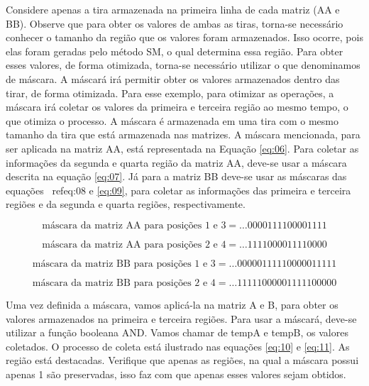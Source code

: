 \documentclass[12pt]{article}
\begin{document}
Considere apenas a tira armazenada na primeira linha de cada matriz (AA e BB).
Observe que para obter os valores de ambas as tiras, torna-se necessário
conhecer o tamanho da região que os valores foram armazenados. Isso ocorre, pois
elas foram geradas pelo método SM, o qual determina essa região. Para obter
esses valores, de forma otimizada, torna-se necessário utilizar o que
denominamos de máscara. A máscará irá permitir obter os valores armazenados
dentro das tirar, de forma otimizada. Para esse exemplo, para otimizar as
operações, a máscara irá coletar os valores da primeira e terceira região ao
mesmo tempo, o que otimiza o processo. A máscara é armazenada em uma tira com o
mesmo tamanho da tira que está armazenada nas matrizes. A máscara mencionada,
para ser aplicada na matriz AA, está representada na Equação \ref{eq:06}. Para
coletar as informações da segunda e quarta região da matriz AA, deve-se usar a
máscara descrita na equação \ref{eq:07}. Já para a matriz BB deve-se usar as
máscaras das equações \
ref{eq:08} e \ref{eq:09}, para coletar as informações das primeira e terceira
regiões e da segunda e quarta regiões, respectivamente.

\begin{equation}\label{eq:06}
\text{máscara da matriz AA para posições 1 e 3} = \ldots0000111100001111
\end{equation}

\begin{equation}\label{eq:07}
\text{máscara da matriz AA para posições 2 e 4} = \ldots1111000011110000
\end{equation}

\begin{equation}\label{eq:08}
\text{máscara da matriz BB para posições 1 e 3} = \ldots00000111110000011111
\end{equation}

\begin{equation}\label{eq:09}
\text{máscara da matriz BB para posições 2 e 4} = \ldots11111000001111100000
\end{equation}

Uma vez definida a máscara, vamos aplicá-la na matriz A e B, para obter os
valores armazenados na primeira e terceira regiões. Para usar a máscará, deve-se
utilizar a função booleana AND. Vamos chamar de tempA e tempB, os valores
coletados. O processo de coleta está ilustrado nas equações \ref{eq:10} e
\ref{eq:11}. As região está destacadas. Verifique que apenas as regiões, na qual
a máscara possui apenas 1 são preservadas, isso faz com que apenas esses valores
sejam obtidos.
\end{document}
